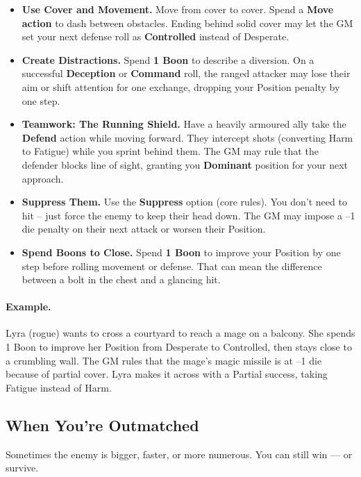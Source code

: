 \begin{itemize}
  \item \textbf{Use Cover and Movement.} Move from cover to cover. Spend a \textbf{Move action} to dash between obstacles. Ending behind solid cover may let the GM set your next defense roll as \textbf{Controlled} instead of Desperate.
  \item \textbf{Create Distractions.} Spend \textbf{1 Boon} to describe a diversion. On a successful \textbf{Deception} or \textbf{Command} roll, the ranged attacker may lose their aim or shift attention for one exchange, dropping your Position penalty by one step.
  \item \textbf{Teamwork: The Running Shield.} Have a heavily armoured ally take the \textbf{Defend} action while moving forward. They intercept shots (converting Harm to Fatigue) while you sprint behind them. The GM may rule that the defender blocks line of sight, granting you \textbf{Dominant} position for your next approach.
  \item \textbf{Suppress Them.} Use the \textbf{Suppress} option (core rules). You don't need to hit -- just force the enemy to keep their head down. The GM may impose a --1 die penalty on their next attack or worsen their Position.
  \item \textbf{Spend Boons to Close.} Spend \textbf{1 Boon} to improve your Position by one step before rolling movement or defense. That can mean the difference between a bolt in the chest and a glancing hit.
\end{itemize}

\paragraph{Example.}
Lyra (rogue) wants to cross a courtyard to reach a mage on a balcony. She spends 1 Boon to improve her Position from Desperate to Controlled, then stays close to a crumbling wall. The GM rules that the mage's magic missile is at --1 die because of partial cover. Lyra makes it across with a Partial success, taking Fatigue instead of Harm.

\subsection{When You're Outmatched}

Sometimes the enemy is bigger, faster, or more numerous. You can still win --- or survive.

